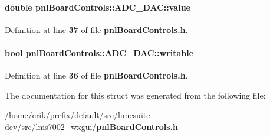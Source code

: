 \paragraph[{value}]{\setlength{\rightskip}{0pt plus 5cm}double pnl\+Board\+Controls\+::\+A\+D\+C\+\_\+\+D\+A\+C\+::value}\label{structpnlBoardControls_1_1ADC__DAC_a2017fddf0bd30cf50de24409aaedaf52}


Definition at line {\bf 37} of file {\bf pnl\+Board\+Controls.\+h}.

\paragraph[{writable}]{\setlength{\rightskip}{0pt plus 5cm}bool pnl\+Board\+Controls\+::\+A\+D\+C\+\_\+\+D\+A\+C\+::writable}\label{structpnlBoardControls_1_1ADC__DAC_aaf2f63805b6c493490ac6d409abc1733}


Definition at line {\bf 36} of file {\bf pnl\+Board\+Controls.\+h}.



The documentation for this struct was generated from the following file\+:\begin{DoxyCompactItemize}
\item 
/home/erik/prefix/default/src/limesuite-\/dev/src/lms7002\+\_\+wxgui/{\bf pnl\+Board\+Controls.\+h}\end{DoxyCompactItemize}
